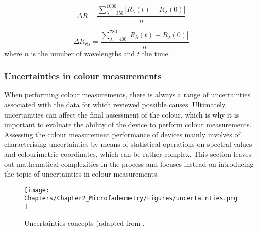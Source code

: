 \begin{equation}
    \Delta R = \frac{\displaystyle\sum_{\lambda=350}^{1000} |R_\lambda(t) - R_\lambda(0)|}{n}
\label{eq:dR}
\end{equation}

\begin{equation}
    \Delta R_{\textrm{vis}} = \frac{\displaystyle\sum_{\lambda=400}^{780} |R_\lambda(t) - R_\lambda(0)|}{n}
\label{eq:dR_vis}
\end{equation}
where $n$ is the number of wavelengths and $t$ the time.


\subsubsection{Uncertainties in colour measurements}

When performing colour measurements, there is always a range of uncertainties associated with the data for which \citet{gardner_uncertainties_2006} reviewed possible causes. Ultimately, uncertainties can affect the final assessment of the colour, which is why it is important to evaluate the ability of the device to perform colour measurements. Assessing the colour measurement performance of devices mainly involves of characterising uncertainties by means of statistical operations on spectral values and colourimetric coordinates, which can be rather complex. This section leaves out mathematical complexities in the process and focuses instead on introducing the topic of uncertainties in colour measurements.\\

\vspace{1cm}

\begin{figure*}[!h]
\centering
\texttt{[image: Chapters/Chapter2\_Microfadeometry/Figures/uncertainties.png]}
\caption[\hspace{0.3cm}Uncertainties concepts]{Uncertainties concepts (adapted from \citet[128-129]{berns_billmeyer_2019}.}
\label{fig:color_uncertainties}
\end{figure*}

